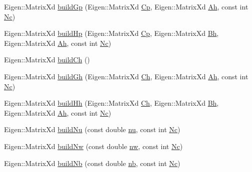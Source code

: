 \begin{DoxyCompactItemize}
\item 
\-Eigen\-::\-Matrix\-Xd \hyperlink{classZmpPreviewController_af9df60a716648bf74467f7a678c8420b}{build\-Gp} (\-Eigen\-::\-Matrix\-Xd \hyperlink{classZmpPreviewController_a1a63870dcc3d51a26c4adc9c97e650ff}{\-Cp}, \-Eigen\-::\-Matrix\-Xd \hyperlink{classZmpPreviewController_a8ee8ec415e25374f4fa687f5a5a6b9df}{\-Ah}, const int \hyperlink{classZmpPreviewController_af0c8b4aa92a6e3e95f80d81a8c91f693}{\-Nc})
\item 
\-Eigen\-::\-Matrix\-Xd \hyperlink{classZmpPreviewController_a4c46593f53f695cb1df53a2af180f4a0}{build\-Hp} (\-Eigen\-::\-Matrix\-Xd \hyperlink{classZmpPreviewController_a1a63870dcc3d51a26c4adc9c97e650ff}{\-Cp}, \-Eigen\-::\-Matrix\-Xd \hyperlink{classZmpPreviewController_a98bd07d03d0a6004b345ef4310cf17b6}{\-Bh}, \-Eigen\-::\-Matrix\-Xd \hyperlink{classZmpPreviewController_a8ee8ec415e25374f4fa687f5a5a6b9df}{\-Ah}, const int \hyperlink{classZmpPreviewController_af0c8b4aa92a6e3e95f80d81a8c91f693}{\-Nc})
\item 
\-Eigen\-::\-Matrix\-Xd \hyperlink{classZmpPreviewController_a58723464a66fc3a1122c613500bb2052}{build\-Ch} ()
\item 
\-Eigen\-::\-Matrix\-Xd \hyperlink{classZmpPreviewController_ac0e73fabb20f31dbbb85ce61414dbb87}{build\-Gh} (\-Eigen\-::\-Matrix\-Xd \hyperlink{classZmpPreviewController_a2093754713ffb2a7adcd1310c73bf775}{\-Ch}, \-Eigen\-::\-Matrix\-Xd \hyperlink{classZmpPreviewController_a8ee8ec415e25374f4fa687f5a5a6b9df}{\-Ah}, const int \hyperlink{classZmpPreviewController_af0c8b4aa92a6e3e95f80d81a8c91f693}{\-Nc})
\item 
\-Eigen\-::\-Matrix\-Xd \hyperlink{classZmpPreviewController_ad6e2263a5d1990e0734537ec6c6c0136}{build\-Hh} (\-Eigen\-::\-Matrix\-Xd \hyperlink{classZmpPreviewController_a2093754713ffb2a7adcd1310c73bf775}{\-Ch}, \-Eigen\-::\-Matrix\-Xd \hyperlink{classZmpPreviewController_a98bd07d03d0a6004b345ef4310cf17b6}{\-Bh}, \-Eigen\-::\-Matrix\-Xd \hyperlink{classZmpPreviewController_a8ee8ec415e25374f4fa687f5a5a6b9df}{\-Ah}, const int \hyperlink{classZmpPreviewController_af0c8b4aa92a6e3e95f80d81a8c91f693}{\-Nc})
\item 
\-Eigen\-::\-Matrix\-Xd \hyperlink{classZmpPreviewController_ad1322ec975c7d022feb24a40fff62f2e}{build\-Nu} (const double \hyperlink{classZmpPreviewController_ac611f084023404faba1ccfab573cd81d}{nu}, const int \hyperlink{classZmpPreviewController_af0c8b4aa92a6e3e95f80d81a8c91f693}{\-Nc})
\item 
\-Eigen\-::\-Matrix\-Xd \hyperlink{classZmpPreviewController_a96bed83f8441cfbd6d6fbff54c5b530d}{build\-Nw} (const double \hyperlink{classZmpPreviewController_a783427b817d77469e1f80426bede5310}{nw}, const int \hyperlink{classZmpPreviewController_af0c8b4aa92a6e3e95f80d81a8c91f693}{\-Nc})
\item 
\-Eigen\-::\-Matrix\-Xd \hyperlink{classZmpPreviewController_ab4ab5756eb9faf991a12b405d116292f}{build\-Nb} (const double \hyperlink{classZmpPreviewController_a6716ee4c94e6f91e608ee1e29fbc7051}{nb}, const int \hyperlink{classZmpPreviewController_af0c8b4aa92a6e3e95f80d81a8c91f693}{\-Nc})
\end{DoxyCompactItemize}
